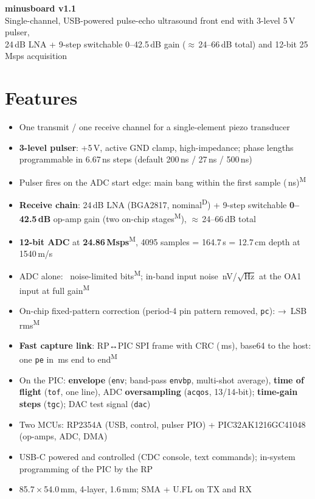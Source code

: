 \documentclass[10pt,a4paper]{article}
\newcommand{\product}{minus}
\newcommand{\board}{v1.1}
\newcommand{\us}{\,\textmu s}
\newcommand{\cmd}[1]{\texttt{#1}}
\newcommand{\meas}{\textsuperscript{M}}
\newcommand{\des}{\textsuperscript{D}}
\begin{document}
\begin{tcolorbox}[colback=accent,colframe=accent,coltext=white,arc=0mm,boxrule=0pt,left=6pt,right=6pt,top=6pt,bottom=6pt]
{\Huge\bfseries \product}\hfill{\large\bfseries board \board}\\[2pt]
{\large Single-channel, USB-powered pulse-echo ultrasound front end with 3-level 5\,V pulser,\\
24\,dB LNA + 9-step switchable 0–42.5\,dB gain ($\approx$\,24–66\,dB total) and 12-bit 25\,Msps acquisition}
\end{tcolorbox}

\vspace{2pt}
\noindent
\begin{minipage}[t]{0.49\textwidth}
\section*{Features}
\begin{itemize}
  \item One transmit / one receive channel for a single-element piezo transducer
  \item \textbf{3-level pulser}: +5\,V, active GND clamp, high-impedance; phase lengths programmable in 6.67\,ns steps (default 200\,ns / 27\,ns / 500\,ns)
  \item Pulser fires on the ADC start edge: main bang within the first sample (\vonsetns\,ns)\meas{}
  \item \textbf{Receive chain}: 24\,dB LNA (BGA2817, nominal\des) + 9-step switchable \textbf{0–42.5\,dB} op-amp gain (two on-chip stages\meas), $\approx$\,24–66\,dB total
  \item \textbf{12-bit ADC} at \textbf{24.86\,Msps}\meas{}, 4095 samples = 164.7\us{} = 12.7\,cm depth at 1540\,m/s
  \item ADC alone: \vadcenob{}~noise-limited bits\meas{}; in-band input noise \veninmax{}\,nV/$\sqrt{\text{Hz}}$ at the OA1 input at full gain\meas{}
  \item On-chip fixed-pattern correction (period-4 pin pattern removed, \cmd{pc}): \xPcRaw{} → \xPcCor\,LSB rms\meas{}
  \item \textbf{Fast capture link}: RP↔PIC SPI frame with CRC (\xLinkMeanA\,ms), base64 to the host: one \cmd{pe} in \xFmtBsix\,ms end to end\meas{}
  \item On the PIC: \textbf{envelope} (\cmd{env}; band-pass \cmd{envbp}, multi-shot average), \textbf{time of flight} (\cmd{tof}, one line), ADC
        \textbf{oversampling} (\cmd{acqos}, 13/14-bit); \textbf{time-gain steps} (\cmd{tgc}); DAC test signal (\cmd{dac})
  \item Two MCUs: RP2354A (USB, control, pulser PIO) + PIC32AK1216GC41048 (op-amps, ADC, DMA)
  \item USB-C powered and controlled (CDC console, text commands); in-system programming of the PIC by the RP
  \item 85.7\,×\,54.0\,mm, 4-layer, 1.6\,mm; SMA + U.FL on TX and RX
\end{itemize}
\end{minipage}\hfill
\end{document}
